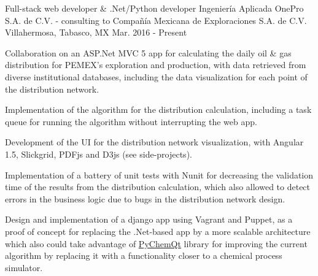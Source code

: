 


\begin{cventries}


\cventry
{Full-stack web developer \& .Net/Python developer} %
{Ingeniería Aplicada OnePro S.A. de C.V. - consulting to Compañía Mexicana de Exploraciones S.A. de C.V.} %
{Villahermosa, Tabasco, MX} %
{Mar. 2016 - Present} %
{ %
\begin{cvitems}
	\item{Collaboration on an ASP.Net MVC 5 app for calculating the daily oil \& gas distribution for PEMEX's exploration and production, with data retrieved from diverse institutional databases, including the data visualization for each point of the distribution network.}
	\item{Implementation of the algorithm for the distribution calculation, including a task queue for running the algorithm without interrupting the web app.}
	\item{Development of the UI for the distribution network visualization, with Angular 1.5, Slickgrid, PDFjs and D3js {\tiny (see side-projects)}.}
	\item {Implementation of a battery of unit tests with Nunit for decreasing the validation time of the results from the distribution calculation, which also allowed to detect errors in the business logic due to bugs in the distribution network design.}
	\item{Design and implementation of a django app using Vagrant and Puppet, as a proof of concept for replacing the .Net-based app by a more scalable architecture which also could take advantage of \href{https://github.com/jjgomera/pychemqt}{PyChemQt} library for improving the current algorithm by replacing it with a functionality closer to a chemical process simulator.}
\end{cvitems}
}



\end{cventries}
